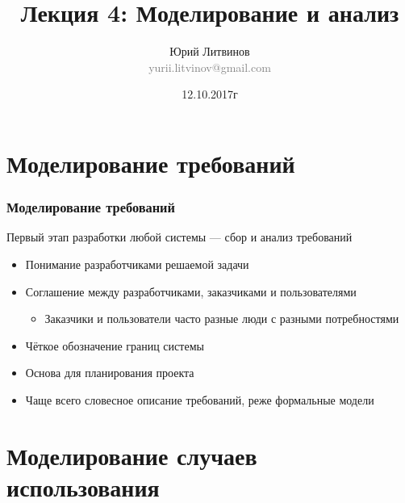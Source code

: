 \documentclass[xetex,mathserif,serif]{beamer}
\title[Моделирование и анализ]{Лекция 4: Моделирование и анализ}
\author[Юрий Литвинов]{Юрий Литвинов\\\small{\textcolor{gray}{yurii.litvinov@gmail.com}}}
\date{12.10.2017г}
\begin{document}
	\frame{\titlepage}

	\section{Моделирование требований}

	\begin{frame}
		\frametitle{Моделирование требований}
		Первый этап разработки любой системы --- сбор и анализ требований
		\begin{itemize}
			\item Понимание разработчиками решаемой задачи
			\item Соглашение между разработчиками, заказчиками и пользователями
			\begin{itemize}
				\item Заказчики и пользователи часто разные люди с разными потребностями
			\end{itemize}
			\item Чёткое обозначение границ системы
			\item Основа для планирования проекта
			\item Чаще всего словесное описание требований, реже формальные модели
		\end{itemize}
	\end{frame}

	\section{Моделирование случаев использования}
	
\end{document}
